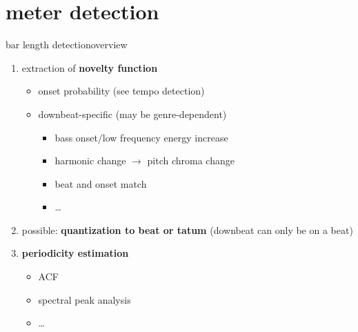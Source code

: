     \section[meter]{meter detection}
            \begin{frame}{bar length detection}{overview}
                \begin{enumerate}
                    \item	extraction of \textbf{novelty function}
                        \begin{itemize}
                            \item   onset probability (see tempo detection)
                            \item   downbeat-specific (may be genre-dependent)
                                \begin{itemize}
                                    \item   bass onset/low frequency energy increase
                                    \item   harmonic change $\rightarrow$ pitch chroma change
                                    \item   beat and onset match
                                    \item   \ldots
                                \end{itemize}
                        \end{itemize}
                    \smallskip
                    \item<2->	possible: \textbf{quantization to beat or tatum} (downbeat can only be on a beat)
                    \smallskip
                    \item<3->	\textbf{periodicity estimation}
                        \begin{itemize}
                            \item   ACF
                            \item   spectral peak analysis
                            \item   \ldots
                        \end{itemize}
                \end{enumerate}
            \end{frame}
